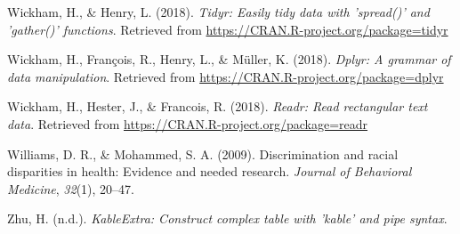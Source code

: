 \documentclass[man]{apa6}
\begin{document}
\hypertarget{ref-R-tidyr}{}
Wickham, H., \& Henry, L. (2018). \emph{Tidyr: Easily tidy data with
'spread()' and 'gather()' functions}. Retrieved from
\url{https://CRAN.R-project.org/package=tidyr}

\hypertarget{ref-R-dplyr}{}
Wickham, H., François, R., Henry, L., \& Müller, K. (2018). \emph{Dplyr:
A grammar of data manipulation}. Retrieved from
\url{https://CRAN.R-project.org/package=dplyr}

\hypertarget{ref-R-readr}{}
Wickham, H., Hester, J., \& Francois, R. (2018). \emph{Readr: Read
rectangular text data}. Retrieved from
\url{https://CRAN.R-project.org/package=readr}

\hypertarget{ref-williams2009discrimination}{}
Williams, D. R., \& Mohammed, S. A. (2009). Discrimination and racial
disparities in health: Evidence and needed research. \emph{Journal of
Behavioral Medicine}, \emph{32}(1), 20--47.

\hypertarget{ref-R-kableExtra}{}
Zhu, H. (n.d.). \emph{KableExtra: Construct complex table with 'kable'
and pipe syntax}.

\endgroup
\end{document}
